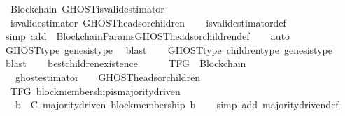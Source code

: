 \begin{isabellebody}
\ {\isacharparenleft}\ Blockchain{\isacharparenright}\ GHOST{\isacharunderscore}is{\isacharunderscore}valid{\isacharunderscore}estimator\ {\isacharcolon}\isanewline
\ \ {\isachardoublequoteopen}is{\isacharunderscore}valid{\isacharunderscore}estimator\ GHOST{\isacharunderscore}heads{\isacharunderscore}or{\isacharunderscore}children{\isachardoublequoteclose}\isanewline
%
\isadelimproof
\ \ %
\endisadelimproof
%
\isatagproof
{}\isamarkupfalse%
\ is{\isacharunderscore}valid{\isacharunderscore}estimator{\isacharunderscore}def\isanewline
\ \ \isamarkupfalse%
\ {\isacharparenleft}simp\ add{\isacharcolon}\ \ BlockchainParams{\isachardot}GHOST{\isacharunderscore}heads{\isacharunderscore}or{\isacharunderscore}children{\isacharunderscore}def{\isacharparenright}\isanewline
\ \ \isamarkupfalse%
\ auto\isanewline
\ \ \isamarkupfalse%
\ GHOST{\isacharunderscore}type\ genesis{\isacharunderscore}type{\isacharparenleft}{}{\isacharparenright}\ \isamarkupfalse%
\ blast\isanewline
\ \ \isamarkupfalse%
\ GHOST{\isacharunderscore}type\ children{\isacharunderscore}type\ genesis{\isacharunderscore}type{\isacharparenleft}{}{\isacharparenright}\ \isamarkupfalse%
\ blast\isanewline
\ \ \isamarkupfalse%
\ best{\isacharunderscore}children{\isacharunderscore}existence\ \ \isanewline
\ \ \isamarkupfalse%
%
\endisatagproof
{\isafoldproof}%
%
\isadelimproof
\isanewline
%
\endisadelimproof
\isanewline
\isanewline
\isanewline
{}\isamarkupfalse%
\ TFG\ {\isacharequal}\ Blockchain\ {\isacharplus}\ \isanewline
\ \ \ ghost{\isacharunderscore}estimator\ {\isacharcolon}\ {\isachardoublequoteopen}{\isasymepsilon}\ {\isacharequal}\ GHOST{\isacharunderscore}heads{\isacharunderscore}or{\isacharunderscore}children{\isachardoublequoteclose}\isanewline
\isanewline
{}\isamarkupfalse%
\ {\isacharparenleft}\ TFG{\isacharparenright}\ block{\isacharunderscore}membership{\isacharunderscore}is{\isacharunderscore}majority{\isacharunderscore}driven\ {\isacharcolon}\isanewline
\ \ {\isachardoublequoteopen}{\isasymforall}\ b\ {\isasymin}\ C{\isachardot}\ majority{\isacharunderscore}driven\ {\isacharparenleft}block{\isacharunderscore}membership\ b{\isacharparenright}{\isachardoublequoteclose}\isanewline
%
\isadelimproof
\ \ %
\endisadelimproof
%
\isatagproof
{}\isamarkupfalse%
\ {\isacharparenleft}simp\ add{\isacharcolon}\ majority{\isacharunderscore}driven{\isacharunderscore}def{\isacharparenright}\isanewline

\end{isabellebody}
